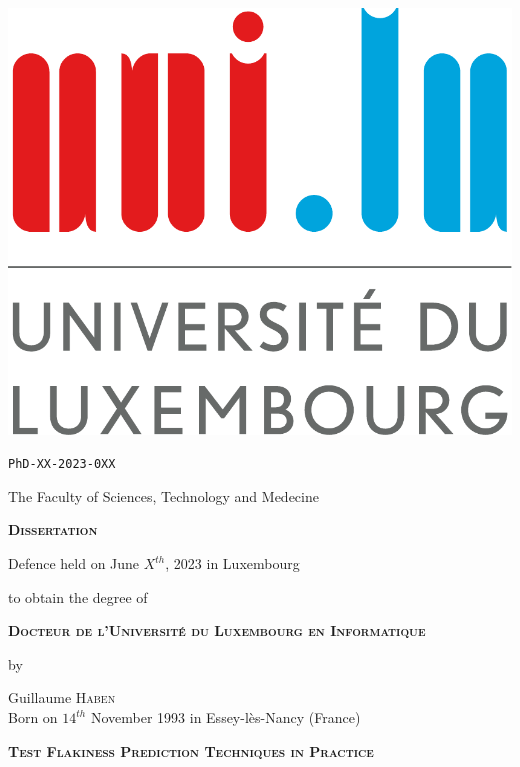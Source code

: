 \thispagestyle{empty}

\begin{center}         
         \includegraphics[width=0.2\linewidth]{figures/logo/logoul.pdf}
         \vspace{0.3cm}\noindent
        
        \texttt{PhD-XX-2023-0XX}
        
         The Faculty of Sciences, Technology and Medecine
         
         \vspace{1cm}\noindent
         {\LARGE \textbf{\textsc{Dissertation}}}
         
         \vspace{0.5cm}
         \noindent
         Defence held on June $X^{th}$, 2023 in Luxembourg
         
         \vspace{0.5cm}\noindent
         to obtain the degree of
         
         \vspace{0.8cm}\noindent
         {\large \textbf{\textsc{Docteur de l'Université du Luxembourg en Informatique}}}

         \vspace{0.5cm}\noindent
         {\Large by}

         \vspace{0.5cm}\noindent
         {\Large Guillaume \textsc{Haben}}\\
         {\footnotesize Born on $14^{th}$ November 1993 in Essey-lès-Nancy (France)}

        \begin{spacing}{1.7}
         \vspace{1cm}\noindent
         {\LARGE \textbf{\textsc{Test Flakiness Prediction Techniques in Practice}}}\\[0.4cm] 
        \end{spacing}
\end{center}

\vspace{2cm}

